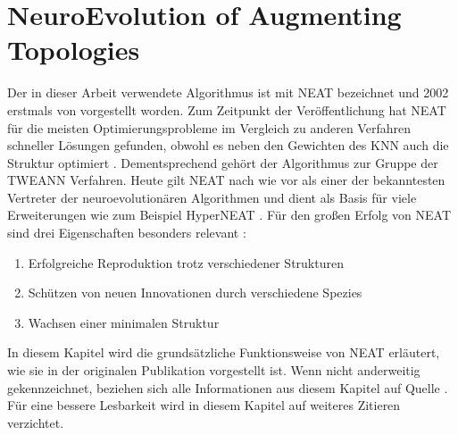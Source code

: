 \section{NeuroEvolution of Augmenting Topologies}
\label{sec:neat}
Der in dieser Arbeit verwendete Algorithmus ist mit \ac{NEAT} bezeichnet und 2002 erstmals von \citeauthor{stanley2002evolving} vorgestellt worden. Zum Zeitpunkt der Veröffentlichung hat \ac{NEAT} für die meisten Optimierungsprobleme im Vergleich zu anderen Verfahren schneller Lösungen gefunden, obwohl es neben den Gewichten des \ac{KNN} auch die Struktur optimiert \cite{stanley2002evolving}. Dementsprechend gehört der Algorithmus zur Gruppe der \ac{TWEANN} Verfahren. Heute gilt \ac{NEAT} nach wie vor als einer der bekanntesten Vertreter der neuroevolutionären Algorithmen und dient als Basis für viele Erweiterungen wie zum Beispiel HyperNEAT \cite{stanley2009hyperneat}.
Für den großen Erfolg von \ac{NEAT} sind drei Eigenschaften besonders relevant \cite{stanley2002evolving}:
\begin{enumerate}
	\item Erfolgreiche Reproduktion trotz verschiedener Strukturen
	\item Schützen von neuen Innovationen durch verschiedene Spezies
	\item Wachsen einer minimalen Struktur
\end{enumerate}
In diesem Kapitel wird die grundsätzliche Funktionsweise von \ac{NEAT} erläutert, wie sie in der originalen Publikation vorgestellt ist. Wenn nicht anderweitig gekennzeichnet, beziehen sich alle Informationen aus diesem Kapitel auf Quelle \cite{stanley2002evolving}. Für eine bessere Lesbarkeit wird in diesem Kapitel auf weiteres Zitieren verzichtet.
